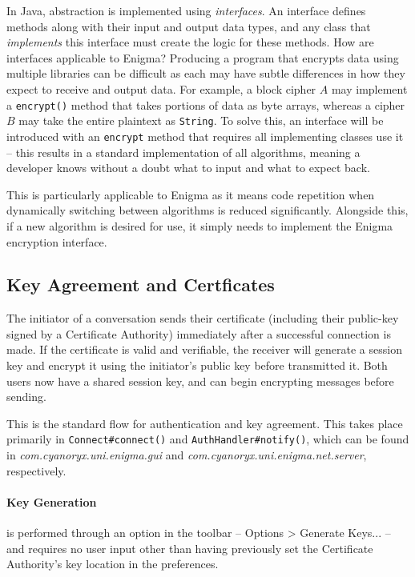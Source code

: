   In Java, abstraction is implemented using \emph{interfaces}. An interface defines methods along with their input and output data types, and any class that \emph{implements} this interface must create the logic for these methods. How are interfaces applicable to Enigma? Producing a program that encrypts data using multiple libraries can be difficult as each may have subtle differences in how they expect to receive and output data. For example, a block cipher $A$ may implement a \verb!encrypt()! method that takes portions of data as byte arrays, whereas a cipher $B$ may take the entire plaintext as \verb!String!. To solve this, an interface will be introduced with an \verb!encrypt! method that requires all implementing classes use it -- this results in a standard implementation of all algorithms, meaning a developer knows without a doubt what to input and what to expect back.
  
  This is particularly applicable to Enigma as it means code repetition when dynamically switching between algorithms is reduced significantly. Alongside this, if a new algorithm is desired for use, it simply needs to implement the Enigma encryption interface.
  
  \subsection{Key Agreement and Certficates}
  
  The initiator of a conversation sends their certificate (including their public-key signed by a Certificate Authority) immediately after a successful connection is made. If the certificate is valid and verifiable, the receiver will generate a session key and encrypt it using the initiator's public key before transmitted it. Both users now have a shared session key, and can begin encrypting messages before sending.
  
  This is the standard flow for authentication and key agreement. This takes place primarily in \verb!Connect#connect()! and \verb!AuthHandler#notify()!, which can be found in \emph{com.cyanoryx.uni.enigma.gui} and \emph{com.cyanoryx.uni.enigma.net.server}, respectively.
  
  \paragraph{Key Generation} is performed through an option in the toolbar -- Options > Generate Keys... -- and requires no user input other than having previously set the Certificate Authority's key location in the preferences.
    
